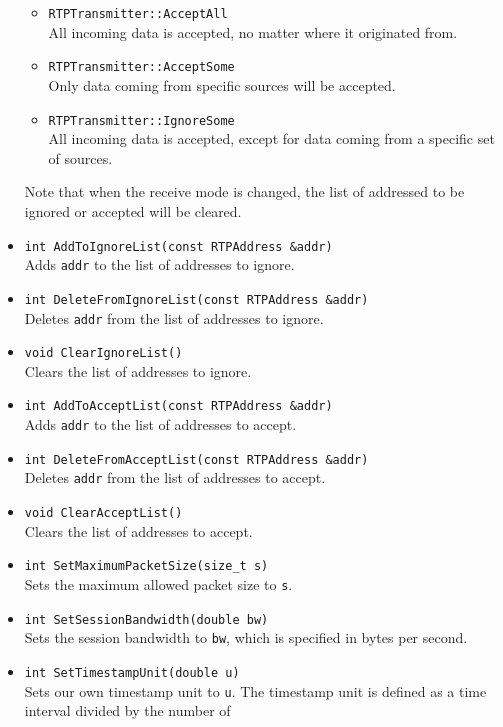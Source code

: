 \documentclass[12pt,a4paper]{article}
\begin{document}
\begin{itemize}
\begin{itemize}
							\item {\tt RTPTransmitter::AcceptAll}\\
								All incoming data is accepted, no matter where it originated
								from.
							\item {\tt RTPTransmitter::AcceptSome}\\
								Only data coming from specific sources will be accepted.
							\item {\tt RTPTransmitter::IgnoreSome}\\
								All incoming data is accepted, except for data coming from
								a specific set of sources.
						\end{itemize}
						Note that when the receive mode is changed, the list of addressed
						to be ignored or accepted will be cleared.
					\item {\tt int AddToIgnoreList(const RTPAddress \&addr)}\\
						Adds {\tt addr} to the list of addresses to ignore.
					\item {\tt int DeleteFromIgnoreList(const RTPAddress \&addr)}\\
						Deletes {\tt addr} from the list of addresses to ignore.
					\item {\tt void ClearIgnoreList()}\\
						Clears the list of addresses to ignore.
					\item {\tt int AddToAcceptList(const RTPAddress \&addr)}\\
						Adds {\tt addr} to the list of addresses to accept.
					\item {\tt int DeleteFromAcceptList(const RTPAddress \&addr)}\\
						Deletes {\tt addr} from the list of addresses to accept.
					\item {\tt void ClearAcceptList()}\\
						Clears the list of addresses to accept.
					\item {\tt int SetMaximumPacketSize(size\_t s)}\\
						Sets the maximum allowed packet size to {\tt s}.
					\item {\tt int SetSessionBandwidth(double bw)}\\
						Sets the session bandwidth to {\tt bw}, which is specified
						in bytes per second.
					\item {\tt int SetTimestampUnit(double u)}\\
						Sets our own timestamp unit to {\tt u}. The timestamp unit
						is defined as a time interval divided by the number of

\end{itemize}
\end{document}
